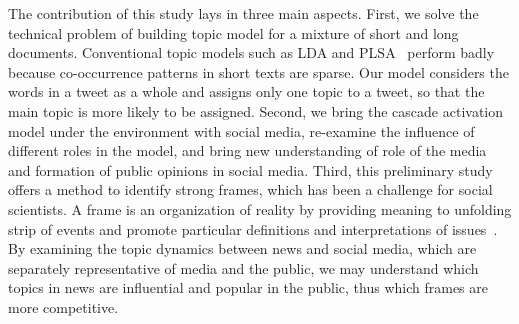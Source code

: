 The contribution of this study lays in three main aspects. First, we solve the technical problem of building topic model for a mixture of short and long documents. Conventional topic models such as LDA and PLSA~\cite{hofmann1999probabilistic} perform badly because co-occurrence patterns in short texts are sparse. Our model considers the words in a tweet as a whole and assigns only one topic to a tweet, so that the main topic is more likely to be assigned.
Second, we bring the cascade activation model under the environment with social media, re-examine the influence of different roles in the model, and bring new understanding of role of the media and formation of public opinions in social media.
Third, this preliminary study offers a method to identify strong frames, which has been a challenge for social scientists. A frame is an organization of reality by providing meaning to unfolding strip of events and promote particular definitions and interpretations of issues~\cite{chong2007framing}. By examining the topic dynamics between news and social media, which are separately representative of media and the public, we may understand which topics in news are influential and popular in the public, thus which frames are more competitive.
